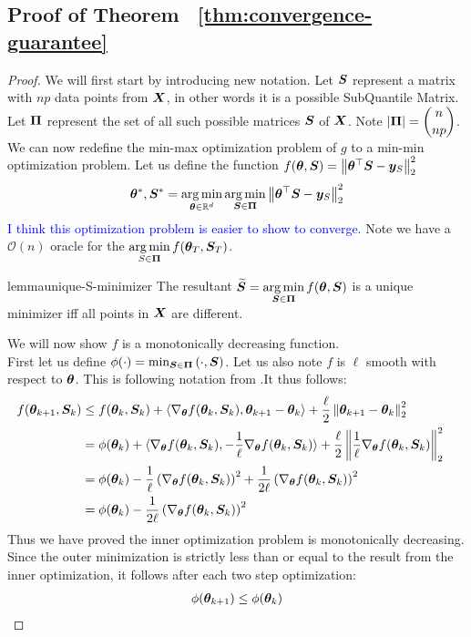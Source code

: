 \documentclass{article} %
\newcommand{\norm}[1]{\left\lVert#1\right\rVert}
\begin{document}
\begin{appendices}
	\subsection{Proof of Theorem ~\ref{thm:convergence-guarantee}}
	\begin{proof}
	We will first start by introducing new notation. Let ${\bm{S}}$ represent a matrix with $np$ data points from ${\bm{X}}$, in other words it is a possible SubQuantile Matrix. Let $\displaystyle{\bm{\Pi}}$ represent the set of all such possible matrices ${\bm{S}}$ of ${\bm{X}}$. Note $\displaystyle \left|{\bm{\Pi}}\right| = \binom{n}{np}$. We can now redefine the min-max optimization problem of $g$ to a min-min optimization problem. Let us define the function $f(\vtheta, \mS) = \norm{\vtheta^\top\mS - \vy_S}_2^2$
	\begin{equation}
		\vtheta^*, \mS^* = \argmin_{\vtheta \in \mathbb{R}^d} \argmin_{\mS \in \vPi} \norm{\vtheta^\top\mS - \vy_S}_2^2
	\end{equation}
	\textcolor{blue}{I think this optimization problem is easier to show to converge.}
	Note we have a $\mathcal{O}(n)$ oracle for the $\displaystyle \operatorname*{arg\,min}_{S\in {\bm{\Pi}}}f({\bm{\theta}}_T,{\bm{S}}_T)$. 
	\begin{restatable}{lemma}{unique-S-minimizer}
		The resultant $\displaystyle \widetilde{{\bm{S}}} = \operatorname*{arg\,min}_{{\bm{S}} \in {\bm{\Pi}}} f({\bm{\theta}},{\bm{S}})$ is a unique minimizer iff all points in ${\bm{X}}$ are different. 
	\end{restatable}
	We will now show $f$ is a monotonically decreasing function.\\
	First let us define $\phi(\cdot) = \min_{{\bm{S}} \in {\bm{\Pi}}}\left(\cdot,{\bm{S}}\right)$. Let us also note $f$ is $\ell$ smooth with respect to ${\bm{\theta}}$. This is following notation from \cite{Jin_2019}.It thus follows:
	\begin{align*}
		f(\vtheta_{k+1}, \mS_k) &\leq f(\vtheta_k, \mS_k) + \langle\nabla_\vtheta f(\vtheta_k,\mS_k), \vtheta_{k+1}-\vtheta_k \rangle + \frac{\ell}{2}\norm{\vtheta_{k+1}-\vtheta_k}_2^2 &&\\
		&= \phi(\vtheta_k) + \langle\nabla_\vtheta f(\vtheta_k,\mS_k), -\frac{1}{\ell}\nabla_\vtheta f(\vtheta_k,\mS_k)\rangle + \frac{\ell}{2}\norm{\frac{1}{\ell}\nabla_\vtheta f(\vtheta_k,\mS_k)}_2^2 &&\\
		&= \phi(\vtheta_k) - \frac{1}{\ell}\left(\nabla_\vtheta f(\vtheta_k,\mS_k)\right)^2 + \frac{1}{2\ell}\left(\nabla_\vtheta f(\vtheta_k,\mS_k)\right)^2 &&\\
		&= \phi(\vtheta_k) - \frac{1}{2\ell}\left(\nabla_\vtheta f(\vtheta_k,\mS_k)\right)^2 &&\\
	\end{align*} 
	Thus we have proved the inner optimization problem is monotonically decreasing. Since the outer minimization is strictly less than or equal to the result from the inner optimization, it follows after each two step optimization: 
	\begin{align*}
		\phi({\bm{\theta}}_{k+1}) \leq \phi({\bm{\theta}}_k)
	\end{align*}
	

\end{proof}
\end{appendices}
\end{document}
